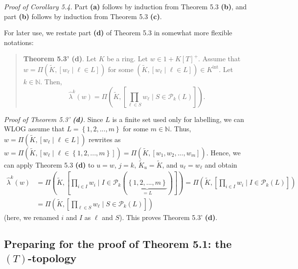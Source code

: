 \documentclass[numbers=enddot,12pt,final,onecolumn,notitlepage]{scrartcl}%
\begin{document}
\textit{Proof of Corollary 5.4.} Part \textbf{(a)} follows by induction from
Theorem 5.3 \textbf{(b)}, and part \textbf{(b)} follows by induction from
Theorem 5.3 \textbf{(c)}.

For later use, we restate part \textbf{(d)} of Theorem 5.3 in somewhat more
flexible notations:

\begin{quote}
\textbf{Theorem 5.3' (d)}. Let $K$ be a ring. Let $w\in1+K\left[  T\right]
^{+}$. Assume that $w=\Pi\left(  \widetilde{K},\left[  w_{\ell}\mid\ell\in
L\right]  \right)  $ for some $\left(  \widetilde{K},\left[  w_{\ell}\mid
\ell\in L\right]  \right)  \in K^{\operatorname*{int}}$. Let $k\in\mathbb{N}$.
Then,%
\[
\widehat{\lambda}^{k}\left(  w\right)  =\Pi\left(  \widetilde{K},\left[
\prod_{\ell\in S}w_{\ell}\mid S\in\mathcal{P}_{k}\left(  L\right)  \right]
\right)  .
\]



\end{quote}

\textit{Proof of Theorem 5.3' \textbf{(d)}.} Since $L$ is a finite set used
only for labelling, we can WLOG assume that $L=\left\{  1,2,...,m\right\}  $
for some $m\in\mathbb{N}$. Thus, $w=\Pi\left(  \widetilde{K},\left[  w_{\ell
}\mid\ell\in L\right]  \right)  $ rewrites as $w=\Pi\left(  \widetilde{K}%
,\left[  w_{\ell}\mid\ell\in\left\{  1,2,...,m\right\}  \right]  \right)
=\Pi\left(  \widetilde{K},\left[  w_{1},w_{2},...,w_{m}\right]  \right)  $.
Hence, we can apply Theorem 5.3 \textbf{(d)} to $u=w$, $j=k$, $\widetilde{K}%
_{u}=\widetilde{K}$, and $u_{\ell}=w_{\ell}$ and obtain%
\begin{align*}
\widehat{\lambda}^{k}\left(  w\right)   &  =\Pi\left(  \widetilde{K},\left[
\prod_{i\in I}w_{i}\mid I\in\mathcal{P}_{k}\left(  \underbrace{\left\{
1,2,...,m\right\}  }_{=L}\right)  \right]  \right)  =\Pi\left(  \widetilde{K}%
,\left[  \prod_{i\in I}w_{i}\mid I\in\mathcal{P}_{k}\left(  L\right)  \right]
\right) \\
&  =\Pi\left(  \widetilde{K},\left[  \prod_{\ell\in S}w_{\ell}\mid
S\in\mathcal{P}_{k}\left(  L\right)  \right]  \right)
\end{align*}
(here, we renamed $i$ and $I$ as $\ell$ and $S$). This proves Theorem 5.3'
\textbf{(d)}.

\subsection{Preparing for the proof of Theorem 5.1: the $\left(  T\right)
$-topology}
\end{document}

